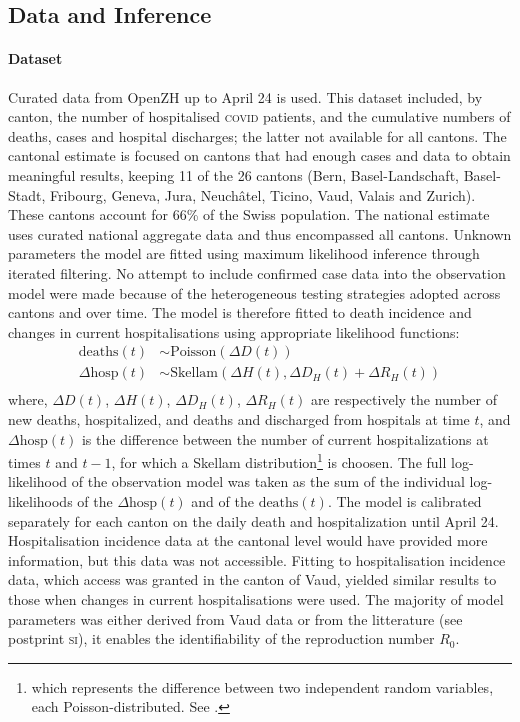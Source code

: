 \subsection{Data and Inference} 
\paragraph{Dataset} Curated data from OpenZH\cite[3\baselineskip]{openZH:OpenZHCovid19:2020} up to April 24 is used. This dataset included, by canton, the number of hospitalised \textsc{covid} patients, and the cumulative numbers of deaths, cases and hospital discharges; the latter not available for all cantons. The cantonal estimate is focused on cantons that had enough cases and data to obtain meaningful results, keeping 11 of the 26 cantons (Bern, Basel-Landschaft, Basel-Stadt, Fribourg, Geneva, Jura, Neuchâtel, Ticino, Vaud, Valais and Zurich). These cantons account for 66\% of the Swiss population. The national estimate uses curated national aggregate data and thus encompassed all cantons\cite{Probst:DaenuprobstCovid19casesswitzerland:2020}. Unknown parameters the model are fitted using maximum likelihood inference through iterated filtering\cite{Ionides:InferenceDynamicLatent:2015}. No attempt to include confirmed case data into the observation model were made because of the heterogeneous testing strategies adopted across cantons and over time. The model is therefore fitted to death incidence and changes in current hospitalisations using appropriate likelihood functions:
\begin{equation}
\begin{split}
 \text{deaths}(t) &\sim \text{Poisson}(\Delta D(t)) \\
\Delta  \text{hosp}(t) &\sim \text{Skellam}(\Delta H(t), \Delta D_H(t) + \Delta R_H(t)) \\
\end{split}
\end{equation}
\noindent where, $\Delta D(t)$, $\Delta H(t)$, $\Delta D_H(t)$, $\Delta R_H(t)$ are respectively the number of new deaths, hospitalized, and deaths and discharged from hospitals at time $t$, and $\Delta \text{hosp}(t)$ is the difference between the number of current hospitalizations at times $t$ and $t-1$, for which a Skellam distribution\footnote{which represents the difference between two independent random variables, each Poisson-distributed. See .} is choosen. The full log-likelihood of the observation model was taken as the sum of the individual log-likelihoods of the $\Delta \text{hosp}(t)$ and of the $\text{deaths}(t)$. 
The model is calibrated separately for each canton on the daily death and hospitalization until April 24. Hospitalisation incidence data at the cantonal level would have provided more information, but this data was not accessible. Fitting to hospitalisation incidence data, which access was granted in the canton of Vaud, yielded similar results to those when changes in current hospitalisations were used. The majority of model parameters was either derived from Vaud data or from the litterature (see postprint \textsc{si}), it enables the identifiability of the reproduction number $R_0$.
 
